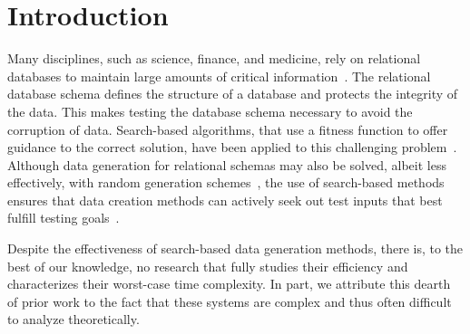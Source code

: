 
\vspace*{-.25in}
\section{Introduction}
\vspace*{-.05in}



Many disciplines, such as science, finance, and medicine, rely on relational databases to maintain large amounts of
critical information~\cite{kapfhammer2007}. The relational database schema defines the structure of a database and
protects the integrity of the data. This makes testing the database schema necessary to avoid the corruption of data.
Search-based algorithms, that use a fitness function to offer guidance to the correct solution, have been applied to
this challenging problem~\cite{Kapfhammer2013}. Although data generation for relational schemas may also be solved,
albeit less effectively, with random generation schemes~\cite{McMinn2015}, the use of search-based methods ensures that
data creation methods can actively seek out test inputs that best fulfill testing goals~\cite{McMinn2004a}.


Despite the effectiveness of search-based data generation methods, there is, to the best of our knowledge, no research
that fully studies their efficiency and characterizes their worst-case time complexity. In part, we attribute this
dearth of prior work to the fact that these systems are complex and thus often difficult to analyze theoretically.


